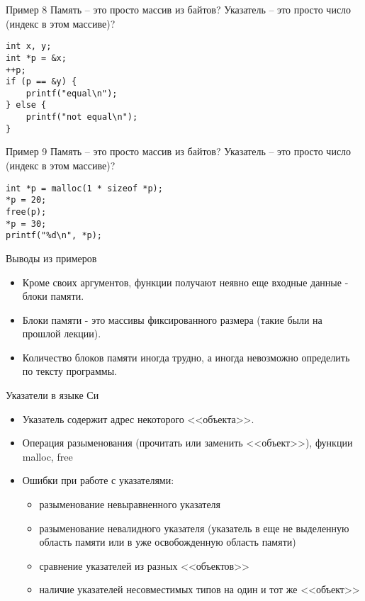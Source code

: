 \documentclass[hyperref={unicode=true}]{beamer}
\begin{document}
    \begin{frame}[fragile]{Пример 8}
    Память -- это просто массив из байтов?
    Указатель -- это просто число (индекс
    в этом массиве)?

    \begin{lstlisting}
int x, y;
int *p = &x;
++p;
if (p == &y) {
    printf("equal\n");
} else {
    printf("not equal\n");
}
    \end{lstlisting}
    \end{frame}

    \begin{frame}[fragile]{Пример 9}
    Память -- это просто массив из байтов?
    Указатель -- это просто число (индекс
    в этом массиве)?

    \begin{lstlisting}
int *p = malloc(1 * sizeof *p);
*p = 20;
free(p);
*p = 30;
printf("%d\n", *p);
    \end{lstlisting}
    \end{frame}

    \begin{frame}{Выводы из примеров}
    \begin{itemize}
    \item
    Кроме своих аргументов, функции получают неявно
    еще входные данные - блоки памяти.
    \item
    Блоки памяти - это массивы фиксированного размера
    (такие были на прошлой лекции).
    \item
    Количество блоков памяти иногда трудно, а иногда
    невозможно определить по тексту программы.
    \end{itemize}
    \end{frame}

\iffalse
    \begin{frame}{Указатели в языке Си}
    \begin{itemize}
    \item
    Указатель содержит адрес некоторого <<объекта>>.
    \item
    Операция разыменования (прочитать или
    заменить <<объект>>), функции malloc, free
    \item
    Ошибки при работе с указателями:
        \begin{itemize}
        \item разыменование невыравненного указателя
        \item разыменование невалидного указателя
        (указатель в еще не выделенную область памяти
        или в уже освобожденную область памяти)
        \item сравнение указателей из разных <<объектов>>
        \item наличие указателей несовместимых типов
        на один и тот же <<объект>>
        \end{itemize}
    \end{itemize}
    \end{frame}
\end{document}
